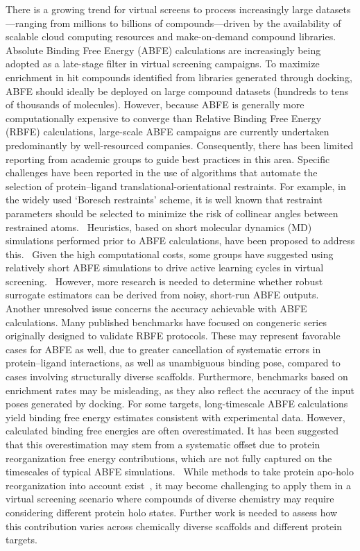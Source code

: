 \documentclass[9pt,bestpractices,pubversion]{livecoms}
\begin{document}
There is a growing trend for virtual screens to process increasingly large datasets—ranging from millions to billions of compounds—driven by the availability of scalable cloud computing resources and make-on-demand compound libraries. Absolute Binding Free Energy (ABFE) calculations are increasingly being adopted as a late-stage filter in virtual screening campaigns. To maximize enrichment in hit compounds identified from libraries generated through docking, ABFE should ideally be deployed on large compound datasets (hundreds to tens of thousands of molecules).
However, because ABFE is generally more computationally expensive to converge than Relative Binding Free Energy (RBFE) calculations, large-scale ABFE campaigns are currently undertaken predominantly by well-resourced companies. Consequently, there has been limited reporting from academic groups to guide best practices in this area.
Specific challenges have been reported in the use of algorithms that automate the selection of protein–ligand translational-orientational restraints. For example, in the widely used ‘Boresch restraints’ scheme, it is well known that restraint parameters should be selected to minimize the risk of collinear angles between restrained atoms.~\cite{Wu2025} Heuristics, based on short molecular dynamics (MD) simulations performed prior to ABFE calculations, have been proposed to address this.~\cite{Heinzelmann2024,Hedges2023} Given the high computational costs, some groups have suggested using relatively short ABFE simulations to drive active learning cycles in virtual screening.~\cite{CrivelliDecker2024} However, more research is needed to determine whether robust surrogate estimators can be derived from noisy, short-run ABFE outputs.
Another unresolved issue concerns the accuracy achievable with ABFE calculations. Many published benchmarks have focused on congeneric series originally designed to validate RBFE protocols. These may represent favorable cases for ABFE as well, due to greater cancellation of systematic errors in protein–ligand interactions, as well as unambiguous binding pose, compared to cases involving structurally diverse scaffolds.\cite{Merz2010} Furthermore, benchmarks based on enrichment rates may be misleading, as they also reflect the accuracy of the input poses generated by docking.
For some targets, long-timescale ABFE calculations yield binding free energy estimates consistent with experimental data. However, calculated binding free energies are often overestimated. It has been suggested that this overestimation may stem from a systematic offset due to protein reorganization free energy contributions, which are not fully captured on the timescales of typical ABFE simulations.~\cite{Chen2023} While methods to take protein apo-holo reorganization into account exist~\cite{khalak2021absdg,fajer2023protreorg}, it may become challenging to apply them in a virtual screening scenario where compounds of diverse chemistry may require considering different protein holo states. Further work is needed to assess how this contribution varies across chemically diverse scaffolds and different protein targets.
\end{document}

